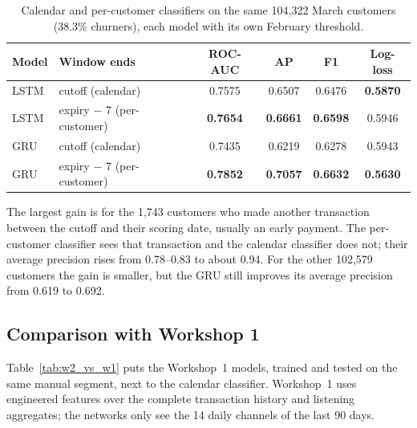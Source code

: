\documentclass{article}
\begin{document}
\begin{table}[H]
\centering
\renewcommand{\arraystretch}{1.25}
\begin{tabular}{|l|l|c|c|c|c|}
\hline
\textbf{Model} & \textbf{Window ends} & \textbf{ROC-AUC} & \textbf{AP} & \textbf{F1} & \textbf{Log-loss} \\ \hline
LSTM & cutoff (calendar)     & 0.7575 & 0.6507 & 0.6476 & \textbf{0.5870} \\ \hline
LSTM & expiry $-$ 7 (per-customer) & \textbf{0.7654} & \textbf{0.6661} & \textbf{0.6598} & 0.5946 \\ \hline
GRU  & cutoff (calendar)     & 0.7435 & 0.6219 & 0.6278 & 0.5943 \\ \hline
GRU  & expiry $-$ 7 (per-customer) & \textbf{0.7852} & \textbf{0.7057} & \textbf{0.6632} & \textbf{0.5630} \\ \hline
\end{tabular}
\caption{Calendar and per-customer classifiers on the same 104{,}322 March customers (38.3\% churners), each model with its own February threshold.}
\label{tab:w2_same_customers}
\end{table}

The largest gain is for the 1{,}743 customers who made another transaction between the cutoff and their scoring date, usually an early payment. The per-customer classifier sees that transaction and the calendar classifier does not; their average precision rises from 0.78--0.83 to about 0.94. For the other 102{,}579 customers the gain is smaller, but the GRU still improves its average precision from 0.619 to 0.692.

\subsection{Comparison with Workshop 1}
\label{sec:w2_vs_w1}

Table~\ref{tab:w2_vs_w1} puts the Workshop~1 models, trained and tested on the same manual segment, next to the calendar classifier. Workshop~1 uses engineered features over the complete transaction history and listening aggregates; the networks only see the 14 daily channels of the last 90 days.
\end{document}
